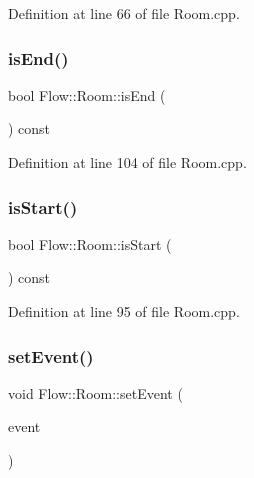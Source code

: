 Definition at line 66 of file Room.\+cpp.

\hypertarget{class_flow_1_1_room_a2a41303b2f9856fd8d9f7fcf7feccab5}{}\label{class_flow_1_1_room_a2a41303b2f9856fd8d9f7fcf7feccab5} 
\subsubsection{\texorpdfstring{is\+End()}{isEnd()}}
{\footnotesize\ttfamily bool Flow\+::\+Room\+::is\+End (\begin{DoxyParamCaption}{ }\end{DoxyParamCaption}) const}



Definition at line 104 of file Room.\+cpp.

\hypertarget{class_flow_1_1_room_ad5fe3a89b1a14b1619f920f624953ff6}{}\label{class_flow_1_1_room_ad5fe3a89b1a14b1619f920f624953ff6} 
\subsubsection{\texorpdfstring{is\+Start()}{isStart()}}
{\footnotesize\ttfamily bool Flow\+::\+Room\+::is\+Start (\begin{DoxyParamCaption}{ }\end{DoxyParamCaption}) const}



Definition at line 95 of file Room.\+cpp.

\hypertarget{class_flow_1_1_room_a578035b5ca2e174d76dae9916c008a52}{}\label{class_flow_1_1_room_a578035b5ca2e174d76dae9916c008a52} 
\subsubsection{\texorpdfstring{set\+Event()}{setEvent()}}
{\footnotesize\ttfamily void Flow\+::\+Room\+::set\+Event (\begin{DoxyParamCaption}\item[{\hyperlink{namespace_flow_a01e62c2d0a9c24924a2fce4b667dd9d8}{Rm\+Event}}]{event }\end{DoxyParamCaption})}



